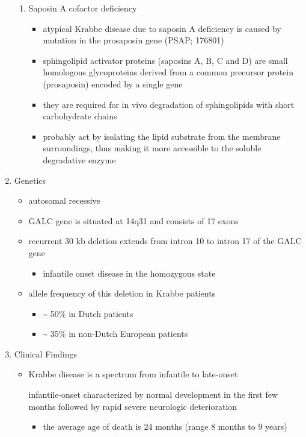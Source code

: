 \documentclass{scrartcl}
\begin{document}
\begin{enumerate}
\begin{enumerate}
\item Saposin A cofactor deficiency
\label{sec:orga528a0c}

\begin{itemize}
\item atypical Krabbe disease due to saposin A deficiency is caused by mutation in the prosaposin gene (PSAP; 176801)
\item sphingolipid activator proteins (saposins A, B, C and D) are small
homologous glycoproteins derived from a common precursor protein
(prosaposin) encoded by a single gene
\item they are required for in vivo degradation of sphingolipids with short carbohydrate chains
\item probably act by isolating the lipid substrate from the membrane
surroundings, thus making it more accessible to the soluble
degradative enzyme
\end{itemize}
\end{enumerate}

\item Genetics
\label{sec:orga5671ca}
\begin{itemize}
\item autosomal recessive
\item GALC gene is situated at 14q31 and consists of 17 exons
\item recurrent 30 kb deletion extends from intron 10 to intron 17 of the GALC gene
\begin{itemize}
\item infantile onset disease in the homozygous state
\end{itemize}
\item allele frequency of this deletion in Krabbe patients
\begin{itemize}
\item \textasciitilde{} 50\% in Dutch patients
\item \textasciitilde{} 35\% in non-Dutch European patients
\end{itemize}
\end{itemize}

\item Clinical Findings
\label{sec:org1b35b16}
\begin{itemize}
\item Krabbe disease is a spectrum from infantile to late-onset

\item[{infantile-onset}] characterized by normal development in the first
few months followed by rapid severe neurologic deterioration
\begin{itemize}
\item the average age of death is 24 months (range 8 months to 9 years)
\end{itemize}


\end{itemize}
\end{enumerate}
\end{document}
